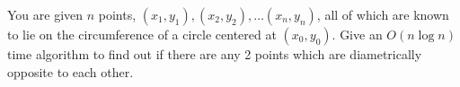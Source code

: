 You are given $n$ points, ${(x_1,y_1), (x_2,y_2), \hdots (x_n,y_n)}$,
all of which are known to lie on the circumference of a circle
centered at $(x_0,y_0)$. Give an $O(n \log  n)$ time algorithm to find
out if there are any 2 points which are diametrically opposite to each
other.

